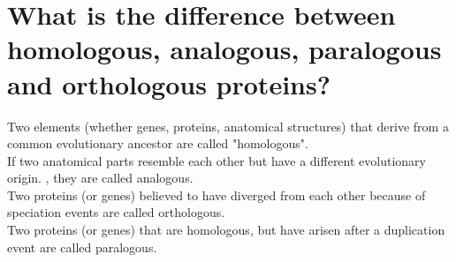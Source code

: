 \documentclass[12pt,letterpaper]{article}
\begin{document}
\section{What is the difference between homologous, analogous, paralogous and orthologous proteins?}
Two elements (whether genes, proteins, anatomical structures) that derive from a common evolutionary ancestor are called "homologous".\\
If two anatomical parts resemble each other but have a different evolutionary origin. , they are called analogous.\\
Two proteins (or genes) believed to have diverged from each other because of speciation events are called orthologous. \\
Two proteins (or genes) that are homologous, but have arisen after a duplication event are called paralogous.
\end{document}
